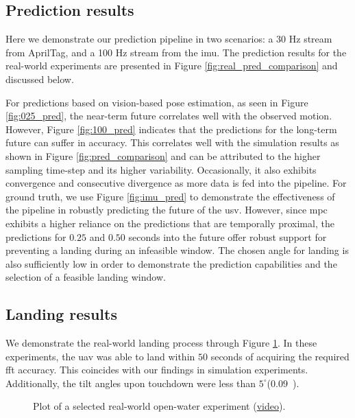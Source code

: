 \documentclass[letterpaper, 10 pt, journal, twoside]{IEEEtran}
\begin{document}
\subsection{Prediction results}



Here we demonstrate our prediction pipeline in two scenarios: a 30 Hz stream from AprilTag, and a 100 Hz stream from the \ac{imu}. The prediction results for the real-world experiments are presented in Figure \ref{fig:real_pred_comparison} and discussed below.

For predictions based on vision-based pose estimation, as seen in Figure \ref{fig:025_pred}, the near-term future correlates well with the observed motion. However, Figure \ref{fig:100_pred} indicates that the predictions for the long-term future can suffer in accuracy.
This correlates well with the simulation results as shown in Figure \ref{fig:pred_comparison} and can be attributed to the higher sampling time-step and its higher variability. Occasionally, it also exhibits convergence and consecutive divergence as more data is fed into the pipeline. For ground truth, we use Figure \ref{fig:imu_pred} to demonstrate the effectiveness of the pipeline in robustly predicting the future of the \ac{usv}. However, since \ac{mpc} exhibits a higher reliance on the predictions that are temporally proximal, the predictions for $0.25$ and $0.50$ seconds into the future offer robust support for preventing a landing during an infeasible window. The chosen angle for landing is also sufficiently low in order to demonstrate the prediction capabilities and the selection of a feasible landing window. 

\subsection{Landing results}
We demonstrate the real-world landing process through Figure \ref{fig:real_experiment_landing}. In these experiments, the \ac{uav} was able to land within $50$ seconds of acquiring the required \ac{fft} accuracy. This coincides with our findings in simulation experiments. Additionally, the tilt angles upon touchdown were less than $5^\circ$($0.09$~).



\begin{figure}[!t]
\centering
{}

\caption{Plot of a selected real-world open-water experiment (\href{\medialink}{video}).}
\label{fig:real_experiment_landing}
\end{figure}
\end{document}
